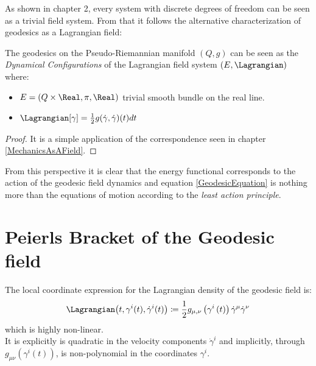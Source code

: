 \documentclass[Main]{subfiles}
\begin{document}
	As shown in chapter 2, every system with discrete degrees of freedom can be seen as a trivial field system.
	From that it follows the alternative characterization of geodesics as a Lagrangian field:
	\begin{corollary}
		The geodesics on the Pseudo-Riemannian manifold $(Q,g)$ can be seen as the \emph{Dynamical Configurations} of the Lagrangian field system $(E,\Lagrangian)$ where:
		\begin{itemize}
			\item $E=(Q\times\Real, \pi, \Real)$ trivial smooth bundle on the real line.
			\item $\Lagrangian[\gamma] = \frac{1}{2} g(\dot{\gamma},\dot{\gamma})(t) dt$
		\end{itemize}
	\end{corollary}
	\begin{proof}
		It is a simple application of the correspondence seen in chapter \ref{MechanicsAsAField}.
	\end{proof}
	
	From this perspective it is clear that the energy functional corresponds to the action of the geodesic field dynamics and equation \ref{GeodesicEquation} is nothing more than the equations of motion according to the \emph{least action principle}.



\section{Peierls Bracket of the Geodesic field}
	The local coordinate expression for the Lagrangian density of the geodesic field is:
	\begin{equation}
		\Lagrangian\big(t,\gamma^i(t), \dot{\gamma}^i(t) \big)\coloneqq \frac{1}{2}g_{\mu,\nu}\left(\gamma^i\left(t\right)\right)\dot{\gamma}^\mu \dot{\gamma}^\nu
	\end{equation}		
	which is highly non-linear. \\
	It is explicitly is quadratic in the velocity components $\dot{\gamma}^i$ and implicitly, through $g_{\mu\nu}(\gamma^i(t))$, is non-polynomial in the %
	coordinates $\gamma^i$.
	
\end{document}
